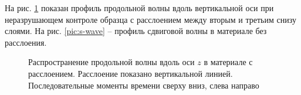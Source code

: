 На рис. \ref{pic:p-wave} показан профиль продольной волны вдоль вертикальной оси при неразрушающем контроле образца с расслоением между вторым и третьим снизу слоями. На рис. \ref{pic:s-wave} -- профиль сдвиговой волны в материале без расслоения.
\begin{figure}%
	\caption{Распространение продольной волны вдоль оси $z$ в материале с расслоением. Расслоение показано вертикальной линией. Последовательные моменты времени сверху вниз, слева направо}
	\label{pic:p-wave}
\end{figure}


